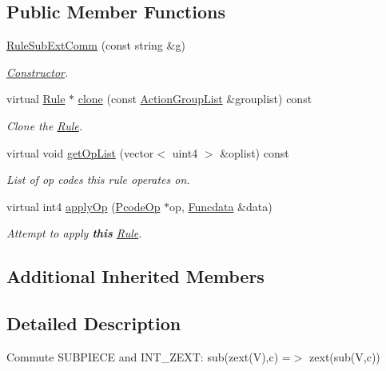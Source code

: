 \subsection*{Public Member Functions}
\begin{DoxyCompactItemize}
\item 
\mbox{\hyperlink{class_rule_sub_ext_comm_a3e72c0fde5dd24a4ce8c6d528b6b25e2}{Rule\+Sub\+Ext\+Comm}} (const string \&g)
\begin{DoxyCompactList}\small\item\em \mbox{\hyperlink{class_constructor}{Constructor}}. \end{DoxyCompactList}\item 
virtual \mbox{\hyperlink{class_rule}{Rule}} $\ast$ \mbox{\hyperlink{class_rule_sub_ext_comm_ae11025cea865b30c65eb436fdb491f88}{clone}} (const \mbox{\hyperlink{class_action_group_list}{Action\+Group\+List}} \&grouplist) const
\begin{DoxyCompactList}\small\item\em Clone the \mbox{\hyperlink{class_rule}{Rule}}. \end{DoxyCompactList}\item 
virtual void \mbox{\hyperlink{class_rule_sub_ext_comm_ab1ae8c84d4b9d857a2c43715e8822e95}{get\+Op\+List}} (vector$<$ uint4 $>$ \&oplist) const
\begin{DoxyCompactList}\small\item\em List of op codes this rule operates on. \end{DoxyCompactList}\item 
virtual int4 \mbox{\hyperlink{class_rule_sub_ext_comm_a3a2efa5df8447bd6c5423d5829a36de0}{apply\+Op}} (\mbox{\hyperlink{class_pcode_op}{Pcode\+Op}} $\ast$op, \mbox{\hyperlink{class_funcdata}{Funcdata}} \&data)
\begin{DoxyCompactList}\small\item\em Attempt to apply {\bfseries{this}} \mbox{\hyperlink{class_rule}{Rule}}. \end{DoxyCompactList}\end{DoxyCompactItemize}
\subsection*{Additional Inherited Members}


\subsection{Detailed Description}
Commute S\+U\+B\+P\+I\+E\+CE and I\+N\+T\+\_\+\+Z\+E\+XT\+: {\ttfamily sub(zext(\+V),c) =$>$ zext(sub(\+V,c))} 


